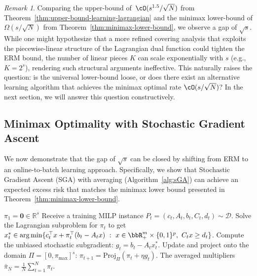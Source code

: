\documentclass{article}
\theoremstyle{plain}
\theoremstyle{definition}
\theoremstyle{remark}
\newtheorem{remark}[theorem]{Remark}
\begin{document}
\begin{remark}
    Comparing the upper-bound of~$\cO(s^{1.5}/\sqrt{N})$ from Theorem~\ref{thm:upper-bound-learning-lagrangian} and the minimax lower-bound of $\Omega(s/\sqrt{N})$ from Theorem~\ref{thm:minimax-lower-bound}, we observe a gap of $\sqrt{s}$. While one might hypothesize that a more refined covering analysis that exploits the piecewise-linear structure of the Lagrangian dual function could tighten the ERM bound, the number of linear pieces $K$ can scale exponentially with $s$ (e.g., $K = 2^s$), rendering such structural arguments ineffective. This naturally raises the question: is the universal lower-bound loose, or does there exist an alternative learning algorithm that achieves the minimax optimal rate $\cO(s/\sqrt{N})$? In the next section, we will answer this question constructively.
\end{remark}

\subsection{Minimax Optimality with Stochastic Gradient Ascent}   
We now demonstrate that the gap of $\sqrt{s}$ can be closed by shifting from ERM to an online-to-batch learning approach. Specifically, we show that Stochastic Gradient Ascent (SGA) with averaging (Algorithm~\ref{alg:sGA}) can achieve an expected excess risk that matches the minimax lower bound presented in Theorem~\ref{thm:minimax-lower-bound}.

\begin{algorithm}[H] 
  \caption{Stochastic Subgradient Ascent}
  \label{alg:sGA}
  \begin{algorithmic}
     $\pi_1 = \mathbf{0} \in \mathbb{R}^s$
    \STATE Receive a training MILP instance $P_t = (c_t, A_t, b_t, C_t, d_t) \sim \mathcal{D}$.
    \STATE Solve the Lagrangian subproblem for $\pi_t$ to get $x_t^* \in \arg\min \{ c_t^\top x + \pi_t^\top (b_t - A_tx)~:~x \in \bbR^m_+ \times \{0, 1\}^p,~C_tx \geq d_t\}$.
    \STATE Compute the unbiased stochastic subgradient: $g_t = b_t - A_t x_t^*$.
    \STATE Update and project onto the domain $\Pi = [0, \pi_{\max}]^s$: $\pi_{t+1} = \text{Proj}_{\Pi}\left( \pi_t + \eta g_t \right)$.
    \ENDFOR
     The averaged multipliers $\bar{\pi}_N = \frac{1}{N}\sum_{t=1}^N \pi_t$.
  \end{algorithmic}
\end{algorithm}
\end{document}
